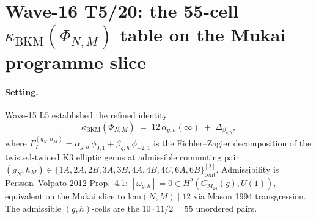 
\providecommand{\phioo}{\phi_{0,1}}
\providecommand{\phimt}{\phi_{-2,1}}
\providecommand{\kBKM}{\kappa_{\mathrm{BKM}}}
\providecommand{\kch}{\kappa_{\mathrm{ch}}}
\providecommand{\Fgh}{F_L^{(g_N,h_M)}}
\providecommand{\agh}{\alpha_{g,h}}
\providecommand{\bgh}{\beta_{g,h}}
\providecommand{\CM}{C_{M_{24}}}
\providecommand{\ClaimStatusTheorem}{\textbf{[Thm]}}
\providecommand{\ClaimStatusConjectured}{\textbf{[Conj]}}
\providecommand{\chiV}{\chi_{V_{24}}}

\section*{Wave-16 T5/20: the 55-cell $\kBKM(\Phi_{N,M})$ table
on the Mukai programme slice}
\label{wn:sec:wave16-t5-55-cell-kappaBKM}

\paragraph{Setting.} Wave-15 L5 established the refined identity
\begin{equation}
\label{eq:wn-wave16-t5-refined}
  \kBKM(\Phi_{N,M}) \;=\; 12\,\agh(\infty) \;+\; \Delta_{\bgh},
\end{equation}
where $\Fgh = \agh\,\phioo + \bgh\,\phimt$ is the Eichler--Zagier
decomposition of the twisted-twined K3 elliptic genus at admissible
commuting pair $(g_N,h_M) \in \{1A,2A,2B,3A,3B,4A,4B,4C,6A,6B\}^{[2]}_{\mathrm{cent}}$.
Admissibility is Persson--Volpato 2012 Prop.\ 4.1: $[\omega_{g,h}] = 0 \in
H^2(\CM(g), U(1))$, equivalent on the Mukai slice to $\mathrm{lcm}(N,M) \mid 12$
via Mason 1994 transgression. The admissible $(g,h)$-cells are the
$10 \cdot 11 / 2 = 55$ unordered pairs.


